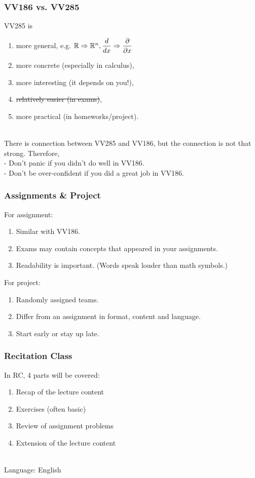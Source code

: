 \documentclass[UTF8]{beamer}
\newcommand{\nullspace}{~\\[15pt]}
\begin{document}
\begin{frame}
    \frametitle{VV186 vs. VV285}
    VV285 is
    \begin{enumerate}
        \item more general,     e.g. $\mathbb{R}\Rightarrow\mathbb{R}^n, \dfrac{d}{dx}\Rightarrow\dfrac{\partial}{\partial x}$
        \item more concrete (especially in calculus),
        \item more interesting (it depends on you!),
        \item \sout{relatively easier (in exams)},
        \item more practical (in homeworks/project).
    \end{enumerate}
    \nullspace
    There is connection between VV285 and VV186, but the connection is not that strong. Therefore,\\
    - Don't panic if you didn't do well in VV186.\\
    - Don't be over-confident if you did a great job in VV186.
\end{frame}

\begin{frame}
    \frametitle{Assignments \& Project}
    For assignment:
    \begin{enumerate}
        \item Similar with VV186.
        \item Exams may contain concepts that appeared in your assignments.
        \item Readability is important. (Words speak louder than math symbols.)
    \end{enumerate}

    For project:
    \begin{enumerate}
        \item Randomly assigned teams.
        \item Differ from an assignment in format, content and language.
        \item Start early or stay up late.
    \end{enumerate}
\end{frame}

\begin{frame}
    \frametitle{Recitation Class}
    In RC, 4 parts will be covered:
    \begin{enumerate}
        \item Recap of the lecture content
        \item Exercises (often basic)
        \item Review of assignment problems
        \item Extension of the lecture content
    \end{enumerate}
    \nullspace
    Language: English
\end{frame}
\end{document}
